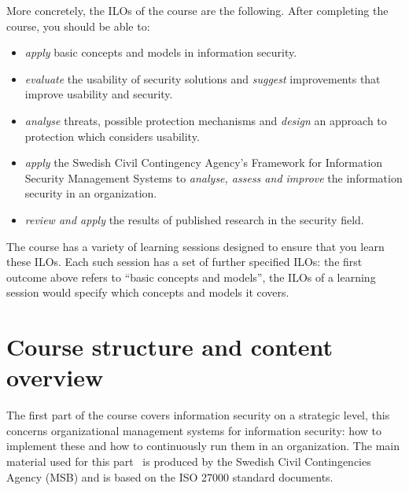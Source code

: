 More concretely, the \acp{ILO} of the course are the following.
After completing the course, you should be able to:
\begin{frame}
\begin{itemize}

  \item \emph{apply} basic concepts and models in information security.

    \pause

  \item \emph{evaluate} the usability of security solutions and \emph{suggest} 
    improvements that improve usability and security.

  \item \emph{analyse} threats, possible protection mechanisms and \emph{design} 
    an approach to protection which considers usability.

    \pause

  \item \emph{apply} the Swedish Civil Contingency Agency's Framework for 
    Information Security Management Systems to \emph{analyse, assess and 
      improve} the information security in an organization.

    \pause

  \item \emph{review and apply} the results of published research in the 
    security field.

\end{itemize}
\end{frame}
The course has a variety of learning sessions designed to ensure that you learn 
these \acp{ILO}.
Each such session has a set of further specified \acp{ILO}:
\eg the first outcome above refers to \enquote{basic concepts and models}, 
the \acp{ILO} of a learning session would specify which concepts and models it 
covers.


\section{Course structure and content overview}%
\label{sec:outline}

The first part of the course covers information security on a strategic level, 
this concerns organizational management systems for information security: how 
to implement these and how to continuously run them in an organization.
The main material used for this part~\cite{%
  MSB2011itm,MSB2011sle,MSB2011p,%
	MSB2011v,MSB2011r,MSB2011gap,MSB2011gb,%
	MSB2011vs,MSB2011us,MSB2011upo,%
	MSB2011pg,MSB2011koa,MSB2011i,%
	MSB2011o,MSB2011g,MSB2011lg,%
	MSB2011ulo,MSB2011kf,MSB2011fa%
} is produced by the Swedish Civil Contingencies Agency (MSB) and is based on 
the ISO 27000 standard documents.

